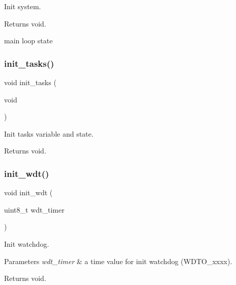 Init system. 

\begin{DoxyReturn}{Returns}
void. 
\end{DoxyReturn}
main loop state \mbox{\label{rmap_8ino_ab4bf0a3d77da083f131d3fa35a37d2b1}} 
\subsubsection{\texorpdfstring{init\+\_\+tasks()}{init\_tasks()}}
{\footnotesize\ttfamily void init\+\_\+tasks (\begin{DoxyParamCaption}\item[{void}]{ }\end{DoxyParamCaption})}



Init tasks variable and state. 

\begin{DoxyReturn}{Returns}
void. 
\end{DoxyReturn}
\mbox{\label{rmap_8ino_a980e73df66b14b1190bc25da430a4f12}} 
\subsubsection{\texorpdfstring{init\+\_\+wdt()}{init\_wdt()}}
{\footnotesize\ttfamily void init\+\_\+wdt (\begin{DoxyParamCaption}\item[{uint8\+\_\+t}]{wdt\+\_\+timer }\end{DoxyParamCaption})}



Init watchdog. 


\begin{DoxyParams}{Parameters}
{\em wdt\+\_\+timer} & a time value for init watchdog (W\+D\+T\+O\+\_\+xxxx). \\
\hline
\end{DoxyParams}
\begin{DoxyReturn}{Returns}
void. 
\end{DoxyReturn}
\mbox{\label{rmap_8ino_a2441543100bf8421f56edd622a2c1d9a}} 
